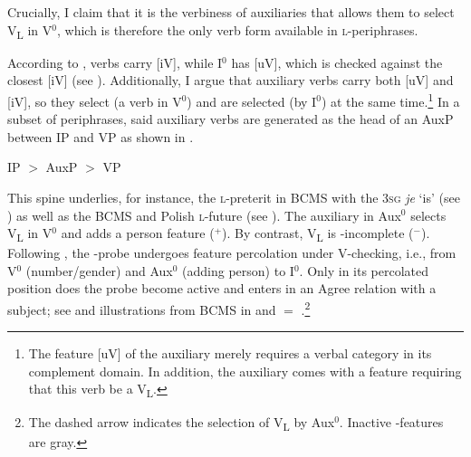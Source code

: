 \documentclass[output=paper]{langscibook}
\begin{document}
Crucially, I claim that it is the verbiness of auxiliaries that allows them to select V\textsubscript{L} in V$^0$, which is therefore the only verb form available in \textsc{l-}periphrases.

According to \citet{Pietraszko2018,Pietraszko2021}, verbs carry [iV], while I$^0$ has [uV], which is checked against the closest [iV] (see \cites{Svenonius1994}{Chomsky1995}{Julien2002}{Adger2003}{Cowper2010}). Additionally, I argue that auxiliary verbs carry both [uV] and [iV], so they select (a verb in V$^0$) and are selected (by I$^0$) at the same time.\footnote{The feature [uV] of the auxiliary merely requires a verbal category in its complement domain. In addition, the auxiliary comes with a feature requiring that this verb be a V\textsubscript{L}.} In a subset of periphrases, said auxiliary verbs are generated as the head of an AuxP between IP and VP as shown in .

\ea IP $>$ AuxP $>$ VP 
\label{pitsch:ex:AuxPsyntax}
\z

\noindent This spine underlies, for instance, the \textsc{l-}preterit in BCMS with the \textsc{3sg} \textit{je} `is' (see \citealt[838]{Tomic1996}) as well as the BCMS and Polish \textsc{l-}future (see \cites[331]{Browne1993}[275]{Migdalski2006}). The auxiliary in Aux$^0$ selects V\textsubscript{L} in V$^0$ and adds a person feature (\textphi$^+$). By contrast, V\textsubscript{L} is \textphi-incomplete (\textphi$^-$). Following \citet{Pietraszko2018}, the \textphi-probe undergoes feature percolation under V-checking, i.e., from V$^0$ (number/gender) and Aux$^0$ (adding person) to I$^0$. Only in its percolated position does the probe become active and enters in an Agree relation with a subject; see  and illustrations from BCMS in  and  $=$ .\footnote{The dashed arrow indicates the selection of V\textsubscript{L} by Aux$^0$. Inactive \textphi-features are gray.}
\end{document}
